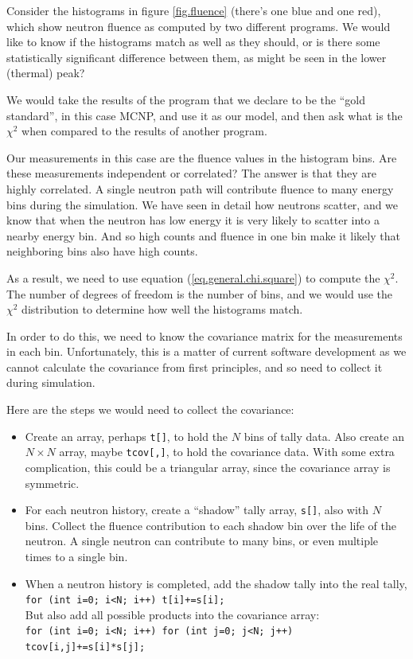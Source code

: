 \documentclass[letterpaper,12pt]{article}
\begin{document}
Consider the histograms in figure \ref{fig.fluence} (there's one blue and one red), which show neutron fluence as computed by two different programs. We would like to know if the histograms match as well as they should, or is there some statistically significant difference between them, as might be seen in the lower (thermal) peak? 

We would take the results of the program that we declare to be the ``gold standard'', in this case MCNP, and use it as our model, and then ask what is the $\chi^2$ when compared to the results of another program.

Our measurements in this case are the fluence values in the histogram bins. Are these measurements independent or correlated? The answer is that they are highly correlated. A single neutron path will contribute fluence to many energy bins during the simulation. We have seen in detail how neutrons scatter, and we know that when the neutron has low energy it is very likely to scatter into a nearby energy bin. And so high counts and fluence in one bin make it likely that neighboring bins also have high counts.

As a result, we need to use equation (\ref{eq.general.chi.square}) to compute the $\chi^2$. The number of degrees of freedom is the number of bins, and we would use the $\chi^2$ distribution to determine how well the histograms match.

In order to do this, we need to know the covariance matrix for the measurements in each bin.  Unfortunately, this is a matter of current software development as we cannot calculate the covariance from first principles, and so need to collect it during simulation.

Here are the steps we would need to collect the covariance:

\begin{itemize}
	\item Create an array, perhaps \texttt{t[]}, to hold the $N$ bins of tally data. Also create an $N\times N$ array, maybe \texttt{tcov[,]}, to hold the covariance data. With some extra complication, this could be a triangular array, since the covariance array is symmetric.
	\item For each neutron history, create a ``shadow'' tally array, \texttt{s[]}, also with $N$ bins. Collect the fluence contribution to each shadow bin over the life of the neutron. A single neutron can contribute to many bins, or even multiple times to a single bin.
	\item When a neutron history is completed, add the shadow tally into the real tally,\\
	\texttt{for (int i=0; i<N; i++) t[i]+=s[i];} \\
	But also add all possible products into the covariance array:\\ 
	\texttt{for (int i=0; i<N; i++) for (int j=0; j<N; j++) tcov[i,j]+=s[i]*s[j];} \\
\end{itemize}
\end{document}
